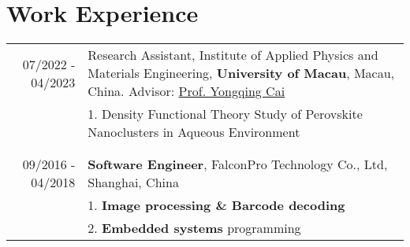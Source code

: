 \documentclass[a4paper,10pt]{article} %
\begin{document}
\section{Work Experience}
\begin{tabular}{r|p{11cm}}
	07/2022 - 04/2023            & Research Assistant,  Institute of Applied Physics and Materials Engineering, \textbf{University of Macau}, Macau, China. Advisor: \href{https://scholar.google.com.sg/citations?user=902XZNwAAAAJ} {Prof. Yongqing Cai}  \\
	& 1. Density Functional Theory Study of  Perovskite Nanoclusters in Aqueous Environment \\
	\multicolumn{2}{c}{} \\	%
	\multicolumn{2}{c}{} \\	%
	09/2016 - 04/2018            & \textbf{Software Engineer}, FalconPro Technology Co., Ltd, Shanghai, China \\                          & 1. \textbf{Image processing \& Barcode decoding}\\
								& 2. \textbf{Embedded systems} programming\\
\end{tabular}
\end{document}
